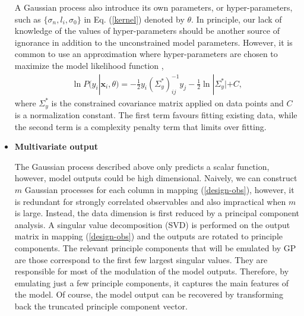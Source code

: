 \documentclass[aps,prl,twocolumn,groupedaddress]{revtex4-1}
\begin{document}
\begin{itemize}
	A Gaussian process also introduce its own parameters, or hyper-parameters, such as $\{\sigma_n, l_i, \sigma_0\}$ in Eq. (\ref{kernel}) denoted by $\theta$. In principle, our lack of knowledge of the values of hyper-parameters should be another source of ignorance in addition to the unconstrained model parameters. However, it is common to use an approximation where hyper-parameters are chosen to maximize the model likelihood function \citep{GP-book},
	\begin{eqnarray}
		\ln P(y_i|\mathbf{x}_i, \theta) = -\frac{1}{2}y_i (\Sigma_y^*)^{-1}_{ij} y_j - \frac{1}{2}\ln|\Sigma_y^*| + C,
	\end{eqnarray}
	where $\Sigma_y^*$ is the constrained covariance matrix applied on data points and $C$ is a normalization constant. The first term favours fitting existing data, while the second term is a complexity penalty term that limits over fitting.
	
	\item{\bf Multivariate output}

	The Gaussian process described above only predicts a scalar function, however, model outputs could be high dimensional. 
	Naively, we can construct $m$ Gaussian processes for each column in mapping (\ref{design-obs}), however, it is redundant for strongly correlated observables and also impractical when $m$ is large. 
	Instead, the data dimension is first reduced by a principal component analysis.
	A singular value decomposition (SVD) is performed on the output matrix in mapping (\ref{design-obs}) and the outputs are rotated to principle components. 
	The relevant principle components that will be emulated by GP are those correspond to the first few largest singular values. 
	They are responsible for most of the modulation of the model outputs. Therefore, by emulating just a few principle components, it captures the main features of the model. 
	Of course, the model output can be recovered by transforming back the truncated principle component vector.
	\end{itemize}
	
\end{document}
